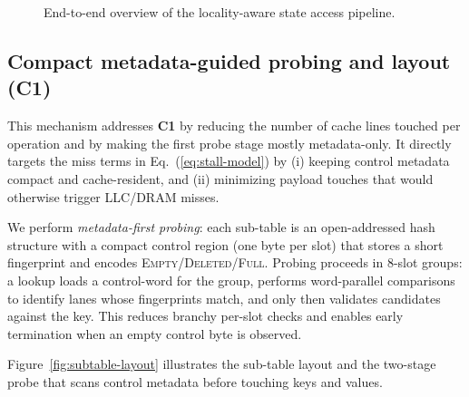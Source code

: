 \documentclass[sigconf]{acmart}
\begin{document}
\begin{figure}[t]
  \centering
  \caption{End-to-end overview of the locality-aware state access pipeline.}
  \label{fig:architecture-overview}
\end{figure}

\subsection{Compact metadata-guided probing and layout (C1)}
This mechanism addresses \textbf{C1} by reducing the number of cache lines touched per operation and by making the first probe stage mostly metadata-only.
It directly targets the miss terms in Eq.~(\ref{eq:stall-model}) by (i) keeping control metadata compact and cache-resident, and (ii) minimizing payload touches that would otherwise trigger LLC/DRAM misses.

We perform \emph{metadata-first probing}: each sub-table is an open-addressed hash structure with a compact control region (one byte per slot) that stores a short fingerprint and encodes \textsc{Empty}/\textsc{Deleted}/\textsc{Full}.
Probing proceeds in 8-slot groups: a lookup loads a control-word for the group, performs word-parallel comparisons to identify lanes whose fingerprints match, and only then validates candidates against the key.
This reduces branchy per-slot checks and enables early termination when an empty control byte is observed.

Figure~\ref{fig:subtable-layout} illustrates the sub-table layout and the two-stage probe that scans control metadata before touching keys and values.
\end{document}
